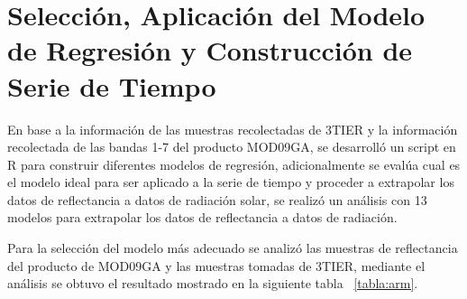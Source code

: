 \section{Selección, Aplicación del Modelo de Regresión y Construcción de Serie de Tiempo}

En base a la información de las muestras recolectadas de 3TIER y la información recolectada de las bandas 1-7 del producto MOD09GA, se desarrolló un script en R 
para construir diferentes modelos de regresión, adicionalmente se evalúa cual es el modelo ideal para ser aplicado a la serie de tiempo y proceder a extrapolar 
los datos de reflectancia a datos de radiación solar, se realizó un análisis con 13 modelos para extrapolar los datos de reflectancia a datos de radiación.

Para la selección del modelo más adecuado se analizó las muestras de reflectancia del producto de MOD09GA y las muestras tomadas de 3TIER, mediante el 
análisis se obtuvo el resultado mostrado en la siguiente tabla ~\ref{tabla:arm}.
